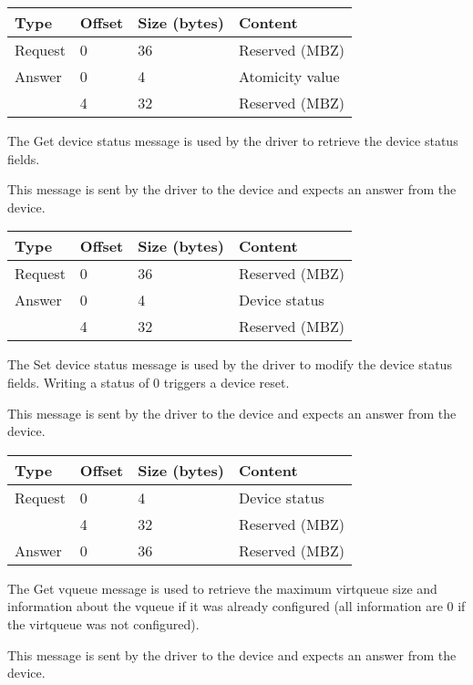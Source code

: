 \begin{tabular}{|l|l|l|l|}
\hline
Type & Offset & Size (bytes) & Content \\
\hline \hline
Request & 0 & 36 & Reserved (MBZ) \\
\hline
Answer & 0 & 4 & Atomicity value \\
& 4 & 32 & Reserved (MBZ) \\
\hline
\end{tabular}


The Get device status message is used by the driver to retrieve the device
status fields.

This message is sent by the driver to the device and expects an answer from the
device.

\begin{tabular}{|l|l|l|l|}
\hline
Type & Offset & Size (bytes) & Content \\
\hline \hline
Request & 0 & 36 & Reserved (MBZ) \\
\hline
Answer & 0 & 4 & Device status \\
& 4 & 32 & Reserved (MBZ) \\
\hline
\end{tabular}


The Set device status message is used by the driver to modify the device status
fields. Writing a status of 0 triggers a device reset.

This message is sent by the driver to the device and expects an answer from the
device.

\begin{tabular}{|l|l|l|l|}
\hline
Type & Offset & Size (bytes) & Content \\
\hline \hline
Request & 0 & 4 & Device status \\
& 4 & 32 & Reserved (MBZ) \\
\hline
Answer & 0 & 36 & Reserved (MBZ) \\
\hline
\end{tabular}


The Get vqueue message is used to retrieve the maximum virtqueue size and
information about the vqueue if it was already configured (all information are
0 if the virtqueue was not configured).

This message is sent by the driver to the device and expects an answer from the
device.


